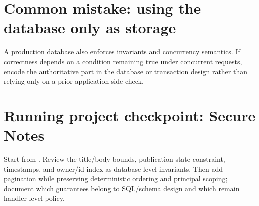\section{Common mistake: using the database only as storage}
A production database also enforces invariants and concurrency semantics. If correctness depends on a condition remaining true under concurrent requests, encode the authoritative part in the database or transaction design rather than relying only on a prior application-side check.

\section{Running project checkpoint: Secure Notes}
Start from . Review the title/body bounds, publication-state constraint, timestamps, and owner/id index as database-level invariants. Then add pagination while preserving deterministic ordering and principal scoping; document which guarantees belong to SQL/schema design and which remain handler-level policy.
